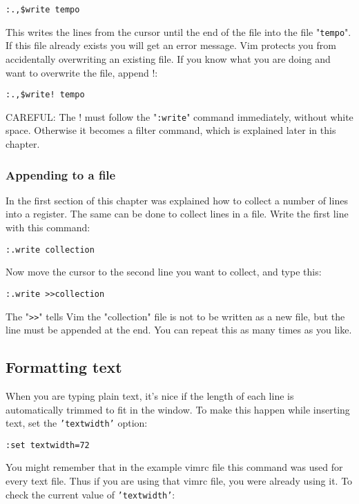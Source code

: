 \begin{Verbatim}[samepage=true]
 :.,$write tempo
\end{Verbatim}

This writes the lines from the cursor until the end of the file into the file "\texttt{tempo}".
If this file already exists you will get an error message.
Vim protects you from accidentally overwriting an existing file.
If you know what you are doing and want to overwrite the file, append !:

\begin{Verbatim}[samepage=true]
 :.,$write! tempo
\end{Verbatim}

CAREFUL: The ! must follow the "\texttt{:write}" command immediately, without white space.
Otherwise it becomes a filter command, which is explained later in this chapter.
\subsubsection{Appending to a file}
In the first section of this chapter was explained how to collect a number of lines into a register.
The same can be done to collect lines in a file.
Write the first line with this command:

\begin{Verbatim}[samepage=true]
 :.write collection
\end{Verbatim}

Now move the cursor to the second line you want to collect, and type this:

\begin{Verbatim}[samepage=true]
 :.write >>collection
\end{Verbatim}

The "\texttt{>>}" tells Vim the "collection" file is not to be written as a new file, but the line must be appended at the end.
You can repeat this as many times as you like.
\subsection{Formatting text}
When you are typing plain text, it's nice if the length of each line is automatically trimmed to fit in the window.
To make this happen while inserting text, set the \texttt{'textwidth'} option:

\begin{Verbatim}[samepage=true]
 :set textwidth=72
\end{Verbatim}

You might remember that in the example vimrc file this command was used for every text file.
Thus if you are using that vimrc file, you were already using it.
To check the current value of \texttt{'textwidth'}:

